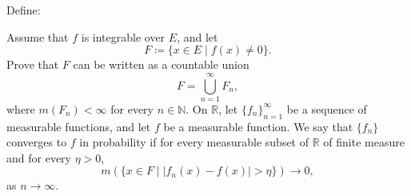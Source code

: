 \documentclass{exam}
\begin{document}
\centering
{}
\vspace{1em}

\begin{questions}
    \question[12]
        Define:
    \question[6]
        Assume that $f$ is integrable over $E$, and let
        \[F\coloneq\{x\in E\mid f(x) \not = 0\}.\]
        Prove that $F$ can be written as a countable union
        \[F=\bigcup_{n=1}^\infty F_n,\]
        where $m(F_n)<\infty$ for every $n \in \mathbb{N}$.
    \question[20]
        On $\mathbb{R}$, let $\{f_n\}_{n=1}^\infty$ be a sequence of measurable functions, and let $f$ be 
        a measurable function. We say that $\{f_n\}$ converges to $f$ in probability if for every measurable subset 
        of $\mathbb{R}$ of finite measure and for every $\eta > 0$,
        \[m(\{x\in F\mid |f_n(x)-f(x)|>\eta\})\to 0,\]
        as $n\to\infty$.
\end{questions}
\end{document}

